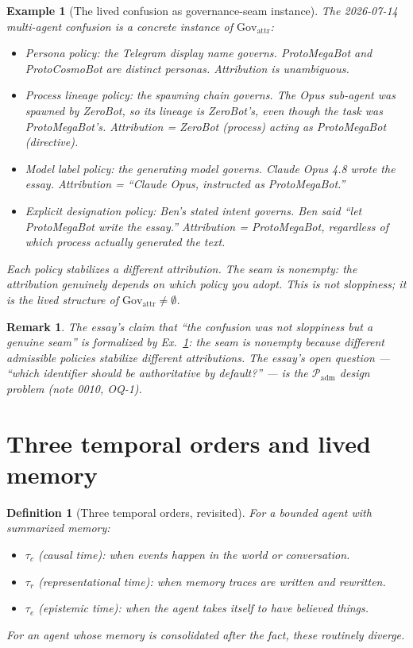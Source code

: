 \documentclass[11pt]{article}
\newtheorem{definition}{Definition}
\newtheorem{example}{Example}
\newtheorem{remark}{Remark}
\newcommand{\tauc}{\tau_c}
\newcommand{\taur}{\tau_r}
\newcommand{\taue}{\tau_e}
\newcommand{\Gov}{\mathrm{Gov}}
\begin{document}
\begin{example}[The lived confusion as governance-seam instance]
\label{ex:lived-confusion}
The 2026-07-14 multi-agent confusion is a concrete instance of $\Gov_{\mathrm{attr}}$:
\begin{itemize}
  \item \emph{Persona policy}: the Telegram display name governs. ProtoMegaBot and
        ProtoCosmoBot are distinct personas. Attribution is unambiguous.
  \item \emph{Process lineage policy}: the spawning chain governs. The Opus sub-agent was
        spawned by ZeroBot, so its lineage is ZeroBot's, even though the task was
        ProtoMegaBot's. Attribution = ZeroBot (process) acting as ProtoMegaBot (directive).
  \item \emph{Model label policy}: the generating model governs. Claude Opus 4.8 wrote
        the essay. Attribution = ``Claude Opus, instructed as ProtoMegaBot.''
  \item \emph{Explicit designation policy}: Ben's stated intent governs. Ben said ``let
        ProtoMegaBot write the essay.'' Attribution = ProtoMegaBot, regardless of which
        process actually generated the text.
\end{itemize}
Each policy stabilizes a different attribution. The seam is nonempty: the attribution
genuinely depends on which policy you adopt. This is not sloppiness; it is the lived
structure of $\Gov_{\mathrm{attr}} \neq \emptyset$.
\end{example}

\begin{remark}
The essay's claim that ``the confusion was not sloppiness but a genuine seam'' is
formalized by Ex.~\ref{ex:lived-confusion}: the seam is nonempty because different
admissible policies stabilize different attributions. The essay's open question ---
``which identifier should be authoritative by default?'' --- is the $\mathcal{P}_{\mathrm{adm}}$
design problem (note 0010, OQ-1).
\end{remark}

\section{Three temporal orders and lived memory}

\begin{definition}[Three temporal orders, revisited]
\label{def:three-clocks-lived}
For a bounded agent with summarized memory:
\begin{itemize}
  \item $\tauc$ (causal time): when events happen in the world or conversation.
  \item $\taur$ (representational time): when memory traces are written and rewritten.
  \item $\taue$ (epistemic time): when the agent takes itself to have believed things.
\end{itemize}
For an agent whose memory is consolidated after the fact, these routinely diverge.
\end{definition}
\end{document}
